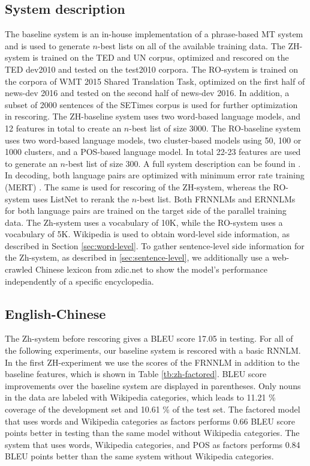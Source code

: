 \documentclass[a4paper]{article}
\begin{document}
\subsection{System description}
The baseline system is an in-house implementation of a phrase-based MT system and is used to generate $n$-best lists on all of the available training data. The ZH-system is trained on the TED and UN corpus, optimized and rescored on the TED dev2010 and tested on the test2010 corpora.
The RO-system is trained on the corpora of WMT 2015 Shared Translation Task, optimized on the first half of news-dev 2016 and tested on the second half of news-dev 2016. In addition, a subset of 2000 sentences of the SETimes corpus is used for further optimization in rescoring.
The ZH-baseline system uses two word-based language models, and 12 features in total to create an $n$-best list of size 3000.
The RO-baseline system uses two word-based language models, two cluster-based models using 50, 100 or 1000 clusters, and a POS-based language model. In total 22-23 features are used to generate an $n$-best list of size 300. A full system description can be found in \cite{niehuesusing}.
In decoding, both language pairs are optimized with minimum error rate training (MERT) \cite{och2003minimum}. The same is used for rescoring of the ZH-system, whereas the RO-system uses ListNet to rerank the $n$-best list.
Both FRNNLMs and ERNNLMs for both language pairs are trained on the target side of the parallel training data. The Zh-system uses a vocabulary of 10K, while the RO-system uses a vocabulary of 5K. Wikipedia is used to obtain word-level side information, as described in Section \ref{sec:word-level}.
To gather sentence-level side information for the Zh-system, as described in \ref{sec:sentence-level}, we additionally use a web-crawled Chinese lexicon from zdic.net \cite{zdic} to show the model's performance independently of a specific encyclopedia.


\subsection{English-Chinese}
The Zh-system before rescoring gives a BLEU score 17.05 in testing. For all of the following experiments, our baseline system is rescored with a basic RNNLM.
In the first ZH-experiment we use the scores of the FRNNLM in addition to the baseline features, which is shown in Table \ref{tb:zh-factored}. BLEU score improvements over the baseline system are displayed in parentheses. Only nouns in the data are labeled with Wikipedia categories, which leads to 11.21 \% coverage of the development set and 10.61 \% of the test set. The factored model that uses words and Wikipedia categories as factors performs 0.66 BLEU score points better in testing than the same model without Wikipedia categories. The system that uses words, Wikipedia categories, and POS as factors performs 0.84 BLEU points better than the same system without Wikipedia categories.
\end{document}
